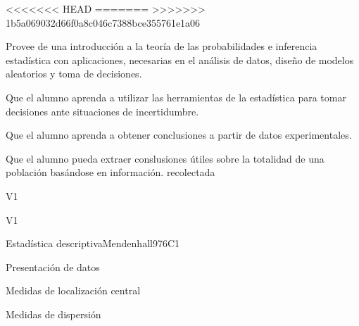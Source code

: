 
\begin{syllabus}

<<<<<<< HEAD
=======
>>>>>>> 1b5a069032d66f0a8c046c7388bce355761e1a06

\begin{justification}
Provee de una introducción a la teoría de las probabilidades e inferencia estadística con aplicaciones, necesarias en el análisis de datos, diseño de modelos aleatorios y toma de decisiones.
\end{justification}

\begin{goals}
\item Que el alumno aprenda a utilizar las herramientas de la estadística para tomar decisiones ante situaciones de incertidumbre.
\item Que el alumno aprenda a obtener conclusiones a partir de datos experimentales.
\item Que el alumno pueda extraer conslusiones útiles sobre la totalidad de una población basándose en información. recolectada
\end{goals}

\begin{outcomes}{V1}
   \item {}
   \item {}
   \item {}
\end{outcomes}

\begin{competences}{V1}
    \item {} 
    \item {}
    \item {}
\end{competences}


\begin{unit}{}{Estadística descriptiva}{Mendenhall97}{6}{C1}
\begin{topics}
      \item Presentación de datos
      \item Medidas de localización central
      \item Medidas de dispersión
   \end{topics}


\end{unit}
\end{syllabus}
